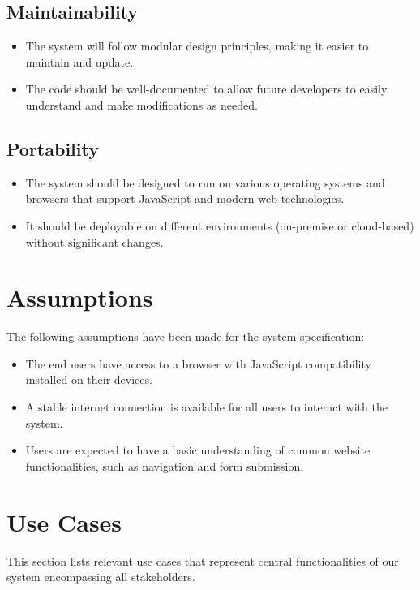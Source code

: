 \documentclass{FastFyp}
\begin{document}
\subsection{Maintainability}
\begin{itemize}
    \item The system will follow modular design principles, making it easier to maintain and update.
    \item The code should be well-documented to allow future developers to easily understand and make modifications as needed.
\end{itemize}

\subsection{Portability}
\begin{itemize}
    \item The system should be designed to run on various operating systems and browsers that support JavaScript and modern web technologies.
    \item It should be deployable on different environments (on-premise or cloud-based) without significant changes.
\end{itemize}

\section{Assumptions}

The following assumptions have been made for the system specification:

\begin{itemize}
    \item The end users have access to a browser with JavaScript compatibility installed on their devices.
    \item A stable internet connection is available for all users to interact with the system.
    \item Users are expected to have a basic understanding of common website functionalities, such as navigation and form submission.
\end{itemize}
\pagebreak
\section{Use Cases}
This section lists relevant use cases that represent central functionalities of our system encompassing all stakeholders.\\
\end{document}

